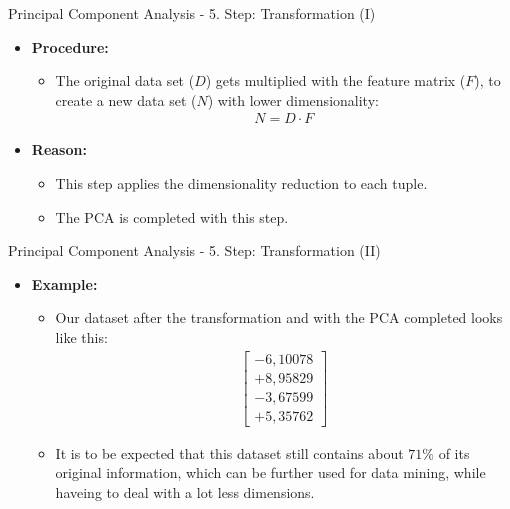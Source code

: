 \begin{frame}{Principal Component Analysis - 5. Step: Transformation (I)}
	\begin{itemize}
		\item \textbf{Procedure:}
		      \begin{itemize}
			      \item The original data set ($D$) gets multiplied with the feature
			            matrix ($F$), to create a new data set ($N$) with lower
			            dimensionality:
			            \begin{align}
				            N = D \cdot F
			            \end{align}
		      \end{itemize}
		\item \textbf{Reason:}
		      \begin{itemize}
			      \item This step applies the dimensionality reduction to each tuple.
			      \item The PCA is completed with this step.
		      \end{itemize}
	\end{itemize}
\end{frame}

\begin{frame}{Principal Component Analysis - 5. Step: Transformation (II)}
	\begin{itemize}
		\item \textbf{Example:}
		      \begin{itemize}
			      \item Our dataset after the transformation and with the PCA
			            completed looks like this: \\
			            \begin{align}
				            \begin{bmatrix} -6,10078 \\ +8,95829 \\ -3,67599 \\ +5,35762
				            \end{bmatrix}
			            \end{align}
			      \item It is to be expected that this dataset still contains about
			            $71\%$ of its original information, which can be further used for
			            data mining, while haveing to deal with a lot less dimensions.
		      \end{itemize}
	\end{itemize}
\end{frame}

